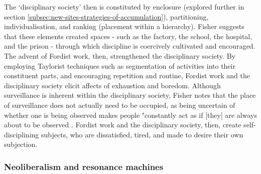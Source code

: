 The `disciplinary society' then is constituted by enclosure (explored further in section \ref{subsec:new-sites-strategies-of-accumulation}), partitioning, individualisation, and ranking (placement within a hierarchy). Fisher suggests that these elements created spaces - such as the factory, the school, the hospital, and the prison - through which discipline is coercively cultivated and encouraged. The advent of Fordist work, then, strengthened the disciplinary society. By employing Taylorist techniques such as segmentation of activities into their constituent parts, and encouraging repetition and routine, Fordist work and the disciplinary society elicit affects of exhaustion and boredom. Although surveillance is inherent within the disciplinary society, Fisher notes that the place of surveillance does not actually need to be occupied, as being uncertain of whether one is being observed makes people "constantly act as if [they] are always about to be observed \citeyearpar[p. 56]{fisher_capitalist_2009}. Fordist work and the disciplinary society, then, create self-disciplining subjects, who are dissatisfied, tired, and made to desire their own subjection.


\subsubsection{Neoliberalism and resonance machines}
\label{neoliberalism-and-resonance-machines}

